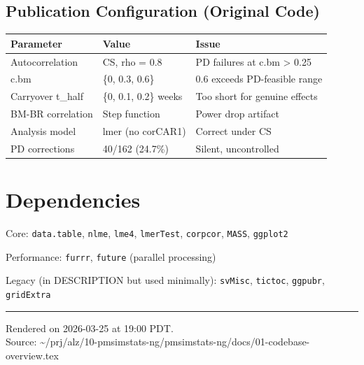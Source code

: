 \documentclass[11pt]{article}
\begin{document}
\subsection{Publication Configuration (Original Code)}

\begin{table}[h]
\centering
\begin{tabular}{lll}
\toprule
Parameter & Value & Issue \\
\midrule
Autocorrelation & CS, rho = 0.8 & PD failures at c.bm > 0.25 \\
c.bm & \{0, 0.3, 0.6\} & 0.6 exceeds PD-feasible range \\
Carryover t\_half & \{0, 0.1, 0.2\} weeks & Too short for genuine effects \\
BM-BR correlation & Step function & Power drop artifact \\
Analysis model & lmer (no corCAR1) & Correct under CS \\
PD corrections & 40/162 (24.7\%) & Silent, uncontrolled \\
\bottomrule
\end{tabular}
\end{table}

\section{Dependencies}

Core: \texttt{data.table}, \texttt{nlme}, \texttt{lme4}, \texttt{lmerTest}, \texttt{corpcor},
\texttt{MASS}, \texttt{ggplot2}

Performance: \texttt{furrr}, \texttt{future} (parallel processing)

Legacy (in DESCRIPTION but used minimally): \texttt{svMisc},
\texttt{tictoc}, \texttt{ggpubr}, \texttt{gridExtra}

\vfill
\noindent\rule{\textwidth}{0.4pt}
{\footnotesize
Rendered on 2026-03-25 at 19:00 PDT.\\
Source: \textasciitilde/prj/alz/10-pmsimstats-ng/pmsimstats-ng/docs/01-codebase-overview.tex}
\end{document}
